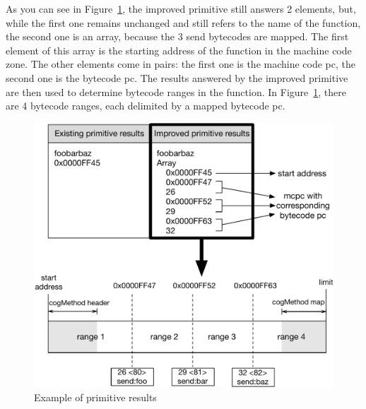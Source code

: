 \documentclass[10pt,nonatbib]{sigplanconf}
\newcommand{\figref}[1]{Figure~\ref{fig:#1}}
\begin{document}
As you can see in \figref{BytecodeRange}, the improved primitive still answers 2 elements, but, while the first one remains unchanged and still refers to the name of the function, the second one is an array, because the 3 send bytecodes are mapped. The first element of this array is the starting address of the function in the machine code zone. The other elements come in pairs: the first one is the machine code pc, the second one is the bytecode pc.
The results answered by the improved primitive are then used to determine bytecode ranges in the function. In \figref{BytecodeRange}, there are 4 bytecode ranges, each delimited by a mapped bytecode pc.  


 \begin{figure}[htp!]
     \begin{center}
         \includegraphics[width=1.0\linewidth]{BytecodeRange}
         \caption{Example of primitive results}
         \label{fig:BytecodeRange}
     \end{center}
 \end{figure}
\end{document}
